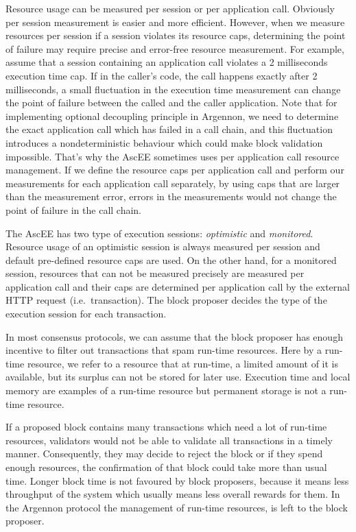 Resource usage can be measured per session or per application call. Obviously per session measurement is
easier and more efficient. However, when we measure resources per session if
a session violates its resource caps, determining the point of failure may require precise and error-free resource
measurement. For example, assume that a session containing an application call
violates a 2 milliseconds execution time cap. If in the caller's code, the call happens exactly after 2 milliseconds,
a small fluctuation in the execution time measurement can
change the point of failure between the called and the caller application. Note that for implementing optional
decoupling principle in Argennon, we need to determine the
exact application call which has failed in a call chain, and this fluctuation introduces a nondeterministic
behaviour which could make block validation impossible. That's why the AscEE sometimes uses per application call
resource management. If we define the resource caps per application call and
perform our measurements for each application call separately, by using caps that are larger than the measurement
error, errors in the measurements would not change the point of failure in the call chain.

The AscEE has two type of execution sessions: \emph{optimistic} and \emph{monitored}. Resource usage of an optimistic
session is always measured per session and default pre-defined resource caps are used. On the other hand, for a
monitored session, resources that can not be measured precisely are measured per application call and their caps are
determined per application call by the external HTTP request (i.e.\ transaction). The block proposer decides the
type of the execution session for each transaction.

In most consensus protocols, we can assume that the block proposer has enough incentive to filter out transactions
that spam run-time resources. Here by a run-time resource, we refer to a resource that at run-time, a limited amount
of it is available, but its surplus can not be stored for later use. Execution time and local memory are
examples of a run-time resource but permanent storage is not a run-time resource.

If a proposed block contains many transactions which need a lot of run-time resources, validators would not
be able to validate all transactions in a timely manner. Consequently, they may decide to reject the block or if they
spend enough resources, the confirmation of that block could take more than usual time. Longer block time is not
favoured by block proposers, because it means less throughput of the system which usually means less overall rewards
for them. In the Argennon protocol the management of run-time resources, is left to the block proposer.


